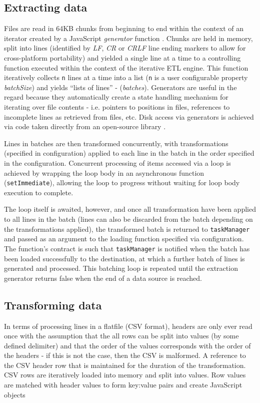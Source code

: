 

\subsection{Extracting data}
Files are read in 64KB chunks from beginning to end within the context of an iterator created by a JavaScript \textit{generator} function \cite{mozillaGenerators}. Chunks are held in memory, split into lines (identified by \textit{LF}, \textit{CR} or \textit{CRLF} line ending markers to allow for cross-platform portability) and yielded a single line at a time to a controlling function executed within the context of the iterative ETL engine. This function iteratively collects \texttt{n} lines at a time into a list (\texttt{n} is a user configurable property \textit{batchSize}) and yields ``lists of lines'' - (\textit{batches}). Generators are useful in the regard because they automatically create a state handling mechanism for iterating over file contents - i.e. pointers to positions in files, references to incomplete lines as retrieved from files, etc. Disk access via generators is achieved via code taken directly from an open-source library \cite{bower16}.

Lines in batches are then transformed concurrently, with transformations (specified in configuration) applied to each line in the batch in the order specified in the configuration. Concurrent processing of items accessed via a loop is achieved by wrapping the loop body in an asynchronous function (\texttt{setImmediate}), allowing the loop to progress without waiting for loop body execution to complete.

The loop itself is awaited, however, and once all transformation have been applied to all lines in the batch (lines can also be discarded from the batch depending on the transformations applied), the transformed batch is returned to \texttt{taskManager} and passed as an argument to the loading function specified via configuration. The function's contract is such that \texttt{taskManager} is notified when the batch has been loaded successfully to the destination, at which a further batch of lines is generated and processed. This batching loop is repeated until the extraction generator returns false when the end of a data source is reached.

\subsection{Transforming data}
In terms of processing lines in a flatfile (CSV format), headers are only ever read once with the assumption that the all rows can be split into values (by some defined delimiter) and that the order of the values corresponds with the order of the headers - if this is not the case, then the CSV is malformed. A reference to the CSV header row that is maintained for the duration of the transformation. CSV rows are iteratively loaded into memory and split into values. Row values are matched with header values to form key:value pairs and create JavaScript objects


